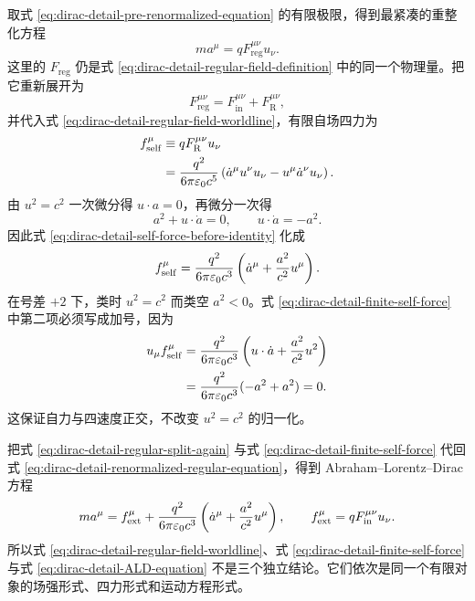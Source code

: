 取式 \eqref{eq:dirac-detail-pre-renormalized-equation} 的有限极限，得到最紧凑的重整化方程
\begin{equation}
 ma^\mu=qF_{\mathrm{reg}}^{\mu\nu}u_\nu.
 \label{eq:dirac-detail-renormalized-regular-equation}
\end{equation}
这里的 $F_{\mathrm{reg}}$ 仍是式 \eqref{eq:dirac-detail-regular-field-definition} 中的同一个物理量。把它重新展开为
\begin{equation}
 F_{\mathrm{reg}}^{\mu\nu}
 =F_{\mathrm{in}}^{\mu\nu}+F_{\mathrm R}^{\mu\nu},
 \label{eq:dirac-detail-regular-split-again}
\end{equation}
并代入式 \eqref{eq:dirac-detail-regular-field-worldline}，有限自场四力为
\begin{align}
 f_{\mathrm{self}}^\mu
 &\equiv qF_{\mathrm R}^{\mu\nu}u_\nu
 \notag\\
 &={q^2\over6\pi\varepsilon_0c^5}
 \left(
 \dot a^\mu u^\nu u_\nu
 -u^\mu\dot a^\nu u_\nu
 \right).
 \label{eq:dirac-detail-self-force-before-identity}
\end{align}
由 $u^2=c^2$ 一次微分得 $u\cdot a=0$，再微分一次得
\begin{equation}
 a^2+u\cdot\dot a=0,
 \qquad
 u\cdot\dot a=-a^2.
 \label{eq:dirac-detail-ua-dot-identity}
\end{equation}
因此式 \eqref{eq:dirac-detail-self-force-before-identity} 化成
\begin{equation}
 f_{\mathrm{self}}^\mu
 ={q^2\over6\pi\varepsilon_0c^3}
 \left(
 \dot a^\mu+{a^2\over c^2}u^\mu
 \right).
 \label{eq:dirac-detail-finite-self-force}
\end{equation}
在号差 $+2$ 下，类时 $u^2=c^2$ 而类空 $a^2<0$。式 \eqref{eq:dirac-detail-finite-self-force} 中第二项必须写成加号，因为
\begin{align*}
 u_\mu f_{\mathrm{self}}^\mu
 &={q^2\over6\pi\varepsilon_0c^3}
 \left(u\cdot\dot a+{a^2\over c^2}u^2\right)\\
 &={q^2\over6\pi\varepsilon_0c^3}(-a^2+a^2)=0.
\end{align*}
这保证自力与四速度正交，不改变 $u^2=c^2$ 的归一化。

把式 \eqref{eq:dirac-detail-regular-split-again} 与式 \eqref{eq:dirac-detail-finite-self-force} 代回式 \eqref{eq:dirac-detail-renormalized-regular-equation}，得到 Abraham--Lorentz--Dirac 方程
\begin{equation}
 ma^\mu
 =f_{\mathrm{ext}}^\mu
 +{q^2\over6\pi\varepsilon_0c^3}
 \left(
 \dot a^\mu+{a^2\over c^2}u^\mu
 \right),
 \qquad
 f_{\mathrm{ext}}^\mu=qF_{\mathrm{in}}^{\mu\nu}u_\nu.
 \label{eq:dirac-detail-ALD-equation}
\end{equation}
所以式 \eqref{eq:dirac-detail-regular-field-worldline}、式 \eqref{eq:dirac-detail-finite-self-force} 与式 \eqref{eq:dirac-detail-ALD-equation} 不是三个独立结论。它们依次是同一个有限对象的场强形式、四力形式和运动方程形式。

